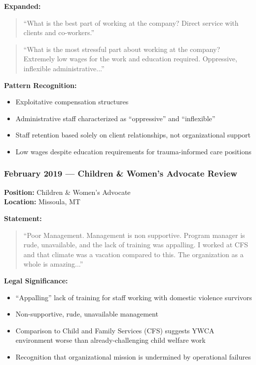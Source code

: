 \documentclass[11pt,letterpaper]{article}
\newenvironment{testimony}{%
    \begin{quote}\itshape\color{DarkGray}%
}{%
    \end{quote}%
}
\begin{document}
\textbf{Expanded:}
\begin{testimony}
``What is the best part of working at the company? Direct service with clients and co-workers.''
\end{testimony}

\begin{testimony}
``What is the most stressful part about working at the company? Extremely low wages for the work and education required. Oppressive, inflexible administrative...''
\end{testimony}

\textbf{Pattern Recognition:}
\begin{itemize}[leftmargin=*]
\item Exploitative compensation structures
\item Administrative staff characterized as ``oppressive'' and ``inflexible''
\item Staff retention based solely on client relationships, not organizational support
\item Low wages despite education requirements for trauma-informed care positions
\end{itemize}

\subsubsection{February 2019 --- Children \& Women's Advocate Review}

\textbf{Position:} Children \& Women's Advocate\\
\textbf{Location:} Missoula, MT

\textbf{Statement:}
\begin{testimony}
``Poor Management. Management is non supportive. Program manager is rude, unavailable, and the lack of training was appalling. I worked at CFS and that climate was a vacation compared to this. The organization as a whole is amazing...''
\end{testimony}

\textbf{Legal Significance:}
\begin{itemize}[leftmargin=*]
\item ``Appalling'' lack of training for staff working with domestic violence survivors
\item Non-supportive, rude, unavailable management
\item Comparison to Child and Family Services (CFS) suggests YWCA environment worse than already-challenging child welfare work
\item Recognition that organizational mission is undermined by operational failures
\end{itemize}
\end{document}
